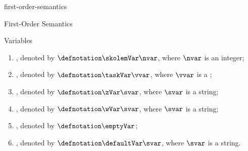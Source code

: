 \documentclass{stex}
\begin{document}
\begin{smodule}{first-order-semantics}
\begin{sfragment}[id=sec:first-order-semantics]{First-Order Semantics}
\begin{sfragment}[id=sec:variables]{Variables}
\begin{sparagraph}[style=symdoc,for={variable name,variable declaration,constVar,holeVar,slotVar,uVar,hiddenVar,
      assumeVar,skolemVar,taskVar,zVar,wVar,emptyVar,defaultVar}]
\begin{enumerate}
          where $\nvar$ is an integer;
        \item {}, denoted by $\defnotation\skolemVar\nvar$,
          where $\nvar$ is an integer;
        \item {}, denoted by $\defnotation\taskVar\vvar$,
          where $\vvar$ is a ;
        \item {}, denoted by $\defnotation\zVar\svar$,
          where $\svar$ is a string;
        \item {}, denoted by $\defnotation\wVar\svar$,
          where $\svar$ is a string;
        \item {}, denoted by $\defnotation\emptyVar$;
        \item {}, denoted by $\defnotation\defaultVar\svar$,
          where $\svar$ is a string.
        \end{enumerate}
    \end{sparagraph}
  \end{sfragment}


\end{sfragment}
\end{smodule}
\end{document}
